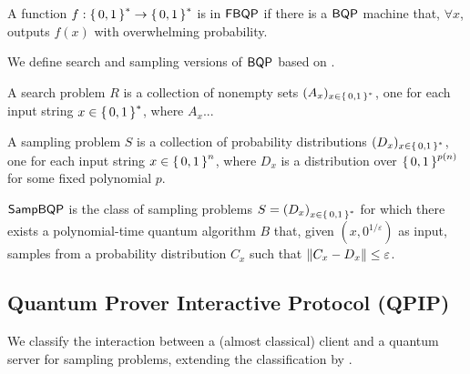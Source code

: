 \begin{definition} [$\FBQP$]
	A function $f:\set{0,1}^*\rightarrow\set{0,1}^*$ is in $\FBQP$ if there is a $\operatorname{\mathsf{BQP}}$ machine that, $\forall x$, outputs $f(x)$ with overwhelming probability.
\end{definition}

We define search and sampling versions of $\operatorname{\mathsf{BQP}}$ based on \cite{aaronson_2013}.

\begin{definition} 
	A search problem $R$ is a collection of nonempty sets $(A_x)_{x\in\set{0, 1}^*}$, one for each input string $x\in\set{0, 1}^*$, where $A_x$... 
\end{definition}

\begin{definition} 
	A sampling problem $S$ is a collection of probability distributions $(D_x)_{x\in\set{0, 1}^*}$, one for each input string $x\in\set{0,1}^n$, where $D_x$ is a distribution over $\set{0,1}^{p(n)}$ for some fixed polynomial $p$.
\end{definition}

\begin{definition} [$\SampBQP$]
	$\SampBQP$ is the class of sampling problems $S=\left(D_x\right)_{x\in\set{0, 1}^*}$ for which there exists a polynomial-time quantum algorithm $B$ that, given $(x, 0^{1/\varepsilon})$ as input, samples from a probability distribution $C_x$ such that $\left\lVert C_x-D_x\right\rVert\leq\varepsilon$.
\end{definition}

\subsection{Quantum Prover Interactive Protocol (QPIP)}
We classify the interaction between a (almost classical) client and a quantum server for sampling problems, extending the classification by \cite{FOCS:Mahadev18a}.

